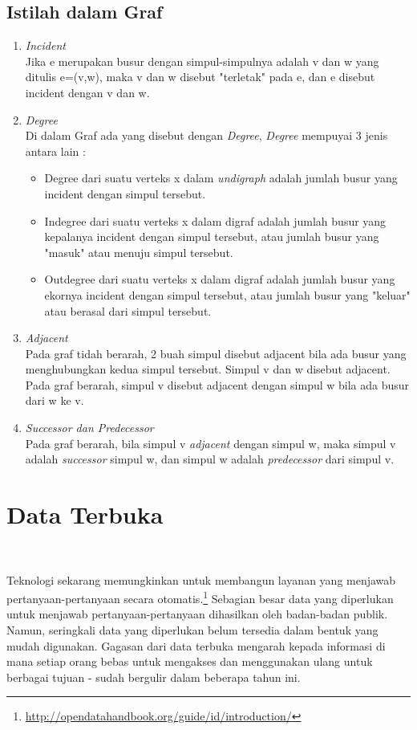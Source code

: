 \subsection{Istilah dalam Graf}
\label{sec: Istilah dalam Graf}
\begin{enumerate}
\item \textit{Incident}\\
Jika e merupakan busur dengan simpul-simpulnya adalah v dan w yang
ditulis e=(v,w), maka v dan w disebut "terletak" pada e, dan e disebut incident
dengan v dan w.
\item \textit{Degree}\\
Di dalam Graf ada yang disebut dengan \textit{Degree}, \textit{Degree} mempuyai 3 jenis antara lain :
\begin{itemize}
\item Degree dari suatu verteks x dalam \textit{undigraph} adalah jumlah busur yang
incident dengan simpul tersebut.
\item Indegree dari suatu verteks x dalam digraf adalah jumlah busur yang
kepalanya incident dengan simpul tersebut, atau jumlah busur yang "masuk" atau menuju simpul tersebut.
\item Outdegree dari suatu verteks x dalam digraf adalah jumlah busur yang
ekornya incident dengan simpul tersebut, atau jumlah busur yang "keluar"
atau berasal dari simpul tersebut.
\end{itemize}
\item \textit{Adjacent}\\
Pada graf tidah berarah, 2 buah simpul disebut adjacent bila ada busur yang
menghubungkan kedua simpul tersebut. Simpul v dan w disebut adjacent. 
Pada graf berarah, simpul v disebut adjacent dengan simpul w bila ada busur
dari w ke v.
\item \textit{Successor dan Predecessor}\\
Pada graf berarah, bila simpul v \textit{adjacent} dengan simpul w, maka simpul v adalah \textit{successor} simpul w, dan simpul w adalah \textit{predecessor} dari simpul v.
\end{enumerate}

\section{Data Terbuka}
\label{sec: Data Terbuka}
~\cite{open:04:terbuka}

Teknologi sekarang memungkinkan untuk membangun layanan yang menjawab pertanyaan-pertanyaan secara otomatis.\footnote{\url{http://opendatahandbook.org/guide/id/introduction/}} Sebagian besar data yang diperlukan untuk menjawab pertanyaan-pertanyaan dihasilkan oleh badan-badan publik. Namun, seringkali data yang diperlukan belum tersedia dalam bentuk yang mudah digunakan. Gagasan dari data terbuka mengarah kepada informasi di mana setiap orang bebas untuk mengakses dan menggunakan ulang untuk berbagai tujuan - sudah bergulir dalam beberapa tahun ini.  	

